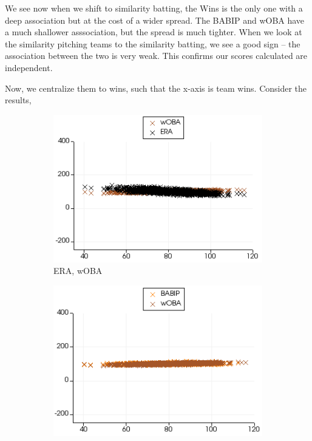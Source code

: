 \documentclass[12pt]{article}
\numberwithin{equation}{subsection}
\begin{document}
We see now when we shift to similarity batting, the Wins is the only one with a deep association but at the cost of a wider spread. The BABIP and wOBA have a much shallower asssociation, but the spread is much tighter. When we look at the similarity pitching teams to the similarity batting, we see a good sign -- the association between the two is very weak. This confirms our scores calculated are independent.

Now, we centralize them to wins, such that the x-axis is team wins. Consider the results,

\begin{figure}[H] 
  \begin{subfigure}[b]{0.5\linewidth}
    \centering
    \includegraphics[width=0.9\linewidth]{wins2} 
    \caption{ERA, wOBA} 
    \label{fig5:a} 
    \vspace{4ex}
  \end{subfigure}%
  \begin{subfigure}[b]{0.5\linewidth}
    \centering
    \includegraphics[width=0.9\linewidth]{wins3} 

\end{subfigure}
\end{figure}
\end{document}
